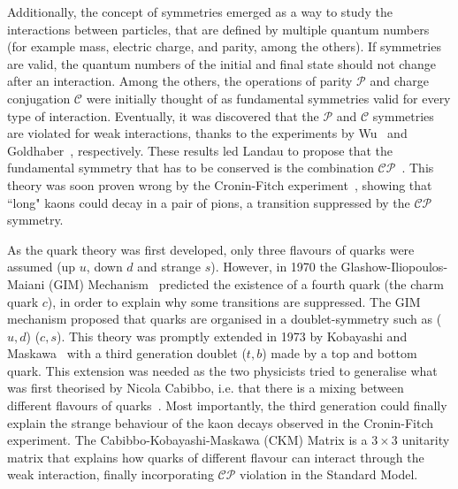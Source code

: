 Additionally, the concept of symmetries emerged as a way to study the interactions between particles, that are defined by multiple quantum numbers (for example mass, electric charge, and parity, among the others). If symmetries are valid, the quantum numbers of the initial and final state should not change after an interaction.  Among the others, the operations of parity $\mathcal{P}$ and charge conjugation $\mathcal{C}$ were initially thought of as fundamental symmetries valid for every type of interaction.
Eventually, it was discovered that the $\mathcal{P}$ and $\mathcal{C}$ symmetries are violated  for weak interactions, thanks to the experiments by Wu~\cite{PhysRev.105.1413} and Goldhaber~\cite{PhysRev.109.1015}, respectively. These results led Landau to propose that the fundamental symmetry that has to be conserved is the combination $\mathcal{CP}$~\cite{LANDAU1957127}. This theory was soon proven wrong by the Cronin-Fitch experiment~\cite{Christenson:1964fg}, showing that ``long" kaons could decay in a pair of pions, a transition suppressed by the $\mathcal{CP}$ symmetry.


As the quark theory was first developed, only three flavours of quarks were assumed (up $u$, down $d$ and strange $s$). 
However, in 1970 the Glashow-Iliopoulos-Maiani (GIM) Mechanism~\cite{Glashow:1970gm} predicted the existence of a fourth quark (the charm quark $c$), in order to explain why some transitions are suppressed. The GIM mechanism proposed that quarks are organised in a doublet-symmetry such as ($u,d$) ($c,s$). This theory was promptly extended in 1973 by Kobayashi and Maskawa~\cite{Kobayashi:1973fv} with a third generation doublet ($t,b$) made by a top and bottom quark. This extension was needed as the two physicists tried to generalise what was first theorised by Nicola Cabibbo, i.e. that there is a mixing between different flavours of quarks~\cite{Cabibbo:1963yz}. Most importantly, the third generation could finally explain the strange behaviour of the kaon decays observed in the Cronin-Fitch experiment. The Cabibbo-Kobayashi-Maskawa (CKM) Matrix is a $3\times3$ unitarity matrix that explains how quarks of different flavour can interact through the weak interaction, finally incorporating $\mathcal{CP}$ violation in the Standard Model.

